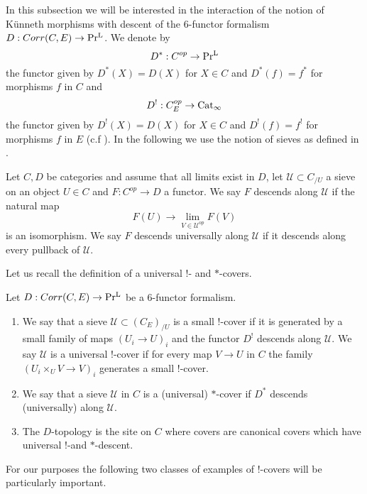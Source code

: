 In this subsection we will be interested in the interaction of the notion of Künneth morphisms with descent of the $6$-functor formalism $D: Corr(C,E) \to \operatorname{Pr^{L}}$. We denote by 
\[
D^*: C^{op} \to \operatorname{Pr^{L}}
\]
the functor given by $D^*(X)=D(X)$ for $X\in C$ and $D^*(f)=f^*$ for morphisms $f$ in $C$ and
\[
D^!: C_E^{op} \to \operatorname{Cat_{\infty}}
\]
the functor given by $D^!(X)=D(X)$ for $X\in C$ and $D^!(f)=f^!$ for morphisms $f$ in $E$ (c.f \Cite[Definition 3.1.4 and 3.2.3]{heyer20246}). In the following we use the notion of sieves as defined in \Cite[Definition A.4.1]{heyer20246}. 
\begin{definition}
 Let $C,D$ be categories and assume that all limits exist in $D$, let $\mathcal{U} \subset C_{/U}$ a sieve on an object $U\in C$ and $F: C^{op}\to D$ a functor. 
We say $F$ descends along $\mathcal{U}$ if the natural map 
     \[
     F(U) \to \lim_{V \in \mathcal{U}^{op}}F(V)
     \]
     is an isomorphism. We say $F$ descends universally along  $\mathcal{U}$ if it descends along every pullback of $\mathcal{U}$.
\end{definition}
Let us recall the definition of a universal $!$- and $*$-covers. 
\begin{definition}\Cite[Definition 3.4.6]{heyer20246}
 Let $D : Corr(C,E) \to \operatorname{Pr^{L}}$ be a  $6$-functor formalism. 
 \begin{enumerate}
     \item We say that a sieve $\mathcal{U} \subset (C_E)_{/U}$ is a small $!$-cover if it is generated by a small family of maps $(U_i \to U)_i$ and the functor $D^!$ descends along $\mathcal{U}$. We say $\mathcal{U}$ is a universal $!$-cover if for every map $V \to U$ in $C$ the family $(U_i\times_U V \to V)_i$ generates a small $!$-cover.
     \item We say that a sieve $\mathcal{U}$ in $C$ is a (universal) $*$-cover if $D^*$ descends (universally) along $\mathcal{U}$.
     \item The $D$-topology is the site on $C$ where covers are canonical covers which have universal $!$-and $*$-descent.
 \end{enumerate}
\end{definition}
For our purposes the following two classes of examples of $!$-covers will be particularly important.

